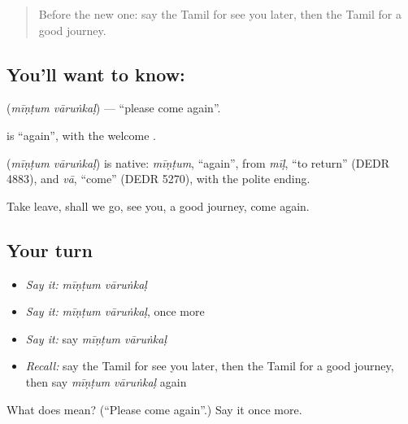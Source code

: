 \label{lesson:TA-C107-comeagain}



\begin{quote}
Before the new one: say the Tamil for see you later, then the Tamil for a good journey.
\end{quote}

\subsection*{You'll want to know:  }
\textbf{ } (\emph{mīṇṭum vāruṅkaḷ}) — \textquotedblleft{}please come again\textquotedblright{}.

\textbf{} is \textquotedblleft{}again\textquotedblright{}, with the welcome \textbf{}.

\begin{cousinweb}
\textbf{ } (\emph{mīṇṭum vāruṅkaḷ}) is native: \emph{mīṇṭum}, \textquotedblleft{}again\textquotedblright{}, from \emph{mīḷ}, \textquotedblleft{}to return\textquotedblright{} (DEDR 4883), and \emph{vā}, \textquotedblleft{}come\textquotedblright{} (DEDR 5270), with the polite ending.
\end{cousinweb}

\begin{grammarlens}[title={What you've built}]
Take leave, shall we go, see you, a good journey, come again.
\end{grammarlens}

\subsection*{Your turn}
\begin{itemize}
\raggedright
  \item \emph{Say it:} \emph{mīṇṭum vāruṅkaḷ}
  \item \emph{Say it:} \emph{mīṇṭum vāruṅkaḷ}, once more
  \item \emph{Say it:} say \emph{mīṇṭum vāruṅkaḷ}
  \item \emph{Recall:} say the Tamil for see you later, then the Tamil for a good journey, then say \emph{mīṇṭum vāruṅkaḷ} again
\end{itemize}

\begin{tcolorbox}[breakable,colback=teal!4,colframe=teal!35!black,title={Before you move on}]
What does   mean? (\textquotedblleft{}Please come again\textquotedblright{}.) Say it once more.
\end{tcolorbox}
